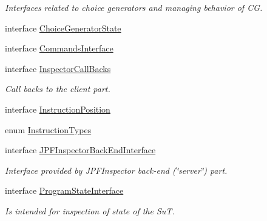 \begin{DoxyCompactItemize}
\begin{DoxyCompactList}\small\item\em Interfaces related to choice generators and managing behavior of CG. \end{DoxyCompactList}\item 
interface \hyperlink{interfacegov_1_1nasa_1_1jpf_1_1inspector_1_1interfaces_1_1_choice_generator_state}{Choice\+Generator\+State}
\item 
interface \hyperlink{interfacegov_1_1nasa_1_1jpf_1_1inspector_1_1interfaces_1_1_commands_interface}{Commands\+Interface}
\item 
interface \hyperlink{interfacegov_1_1nasa_1_1jpf_1_1inspector_1_1interfaces_1_1_inspector_call_backs}{Inspector\+Call\+Backs}
\begin{DoxyCompactList}\small\item\em Call backs to the client part. \end{DoxyCompactList}\item 
interface \hyperlink{interfacegov_1_1nasa_1_1jpf_1_1inspector_1_1interfaces_1_1_instruction_position}{Instruction\+Position}
\item 
enum \hyperlink{enumgov_1_1nasa_1_1jpf_1_1inspector_1_1interfaces_1_1_instruction_types}{Instruction\+Types}
\item 
interface \hyperlink{interfacegov_1_1nasa_1_1jpf_1_1inspector_1_1interfaces_1_1_j_p_f_inspector_back_end_interface}{J\+P\+F\+Inspector\+Back\+End\+Interface}
\begin{DoxyCompactList}\small\item\em Interface provided by J\+P\+F\+Inspector back-\/end (\char`\"{}server\char`\"{}) part. \end{DoxyCompactList}\item 
interface \hyperlink{interfacegov_1_1nasa_1_1jpf_1_1inspector_1_1interfaces_1_1_program_state_interface}{Program\+State\+Interface}
\begin{DoxyCompactList}\small\item\em Is intended for inspection of state of the SuT. \end{DoxyCompactList}\end{DoxyCompactItemize}
